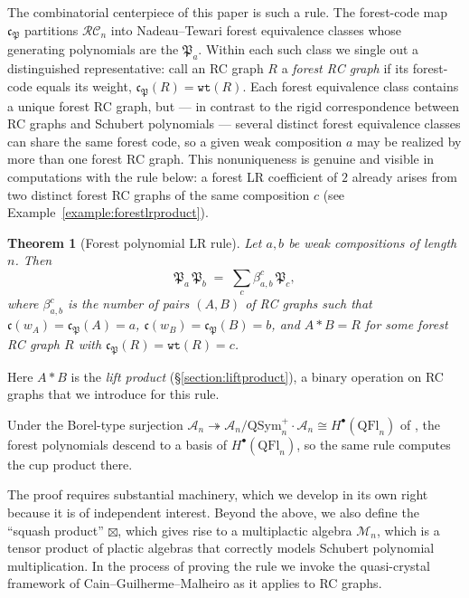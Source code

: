 \documentclass{amsart}
\newtheorem{theorem}{Theorem}[section]
\theoremstyle{definition}
\theoremstyle{remark}
\numberwithin{equation}{subsection}
\newcommand{\wof}[1]{w_{#1}}
\newcommand{\wtt}{\mathtt{wt}}
\newcommand{\RC}{\mathcal{RC}}
\newcommand{\coma}{\mathcal{A}}
\newcommand{\code}{\mathfrak{c}}
\newcommand{\forest}{\mathfrak{P}}
\begin{document}
The combinatorial centerpiece of this paper is such a rule. The forest-code map $\code_\forest$ partitions $\RC_n$ into Nadeau--Tewari forest equivalence classes whose generating polynomials are the $\forest_a$. Within each such class we single out a distinguished representative: call an RC graph $R$ a \emph{forest RC graph} if its forest-code equals its weight, $\code_\forest(R) = \wtt(R)$. Each forest equivalence class contains a unique forest RC graph, but --- in contrast to the rigid correspondence between RC graphs and Schubert polynomials --- several distinct forest equivalence classes can share the same forest code, so a given weak composition $a$ may be realized by more than one forest RC graph. This nonuniqueness is genuine and visible in computations with the rule below: a forest LR coefficient of $2$ already arises from two distinct forest RC graphs of the same composition $c$ (see Example~\ref{example:forestlrproduct}).

\begin{theorem}[Forest polynomial LR rule]\label{theorem:forestpolyLR}
Let $a,b$ be weak compositions of length $n$. Then
$$\forest_a\,\forest_b \;=\; \sum_c \beta_{a,b}^c\,\forest_c,$$
where $\beta_{a,b}^c$ is the number of pairs $(A,B)$ of RC graphs such that $\code(\wof{A}) = \code_\forest(A) = a$, $\code(\wof{B}) = \code_\forest(B) = b$, and $A*B = R$ for some forest RC graph $R$ with $\code_\forest(R) = \wtt(R) = c$.
\end{theorem}
Here $A*B$ is the \emph{lift product} (\S\ref{section:liftproduct}), a binary operation on RC graphs that we introduce for this rule.


Under the Borel-type surjection $\coma_n\twoheadrightarrow \coma_n/\mathrm{QSym}_n^+\cdot\coma_n\cong H^\bullet(\mathrm{QFl}_n)$ of \cite{bergeron2025qsymflag}, the forest polynomials descend to a basis of $H^\bullet(\mathrm{QFl}_n)$, so the same rule computes the cup product there.



The proof requires substantial machinery, which we develop in its own right because it is of independent interest. Beyond the above, we also define the ``squash product'' $\boxtimes$, which gives rise to a multiplactic algebra $\mathcal{M}_n$, which is a tensor product of plactic algebras that correctly models Schubert polynomial multiplication. In the process of proving the rule we invoke the quasi-crystal framework of Cain--Guilherme--Malheiro \cite{cain2023quasicrystals} as it applies to RC graphs. 
\end{document}
